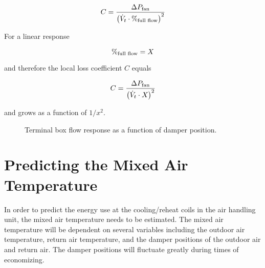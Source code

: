  \begin{equation}
     C = \frac{\Delta P_{\text{fan}}}{\left( \dot{V}_{t} \cdot \%_{\text{full flow}} \right)^2}
 \end{equation}
 
For a linear response

\begin{equation}
    \%_{\text{full flow}} = X_{}
\end{equation}

and therefore the local loss coefficient \(C\) equals


\begin{equation}
C = \frac{\Delta P_{\text{fan}}}{\left( \dot{V}_{t} \cdot X_{}  \right)^2}
\end{equation}

and grows as a function of \(1/x^2\). 





\begin{figure}
\centering
{}
\caption{Terminal box flow response as a function of damper position.}
\label{fig:flowVersusDamperPos}
\end{figure}


\section{Predicting the Mixed Air Temperature}

In order to predict the energy use at the cooling/reheat coils in the air handling unit, the mixed air temperature needs to be estimated. The mixed air temperature will be dependent on several variables including the outdoor air temperature, return air temperature, and the damper positions of the outdoor air and return air. The damper positions will fluctuate greatly during times of economizing.  


